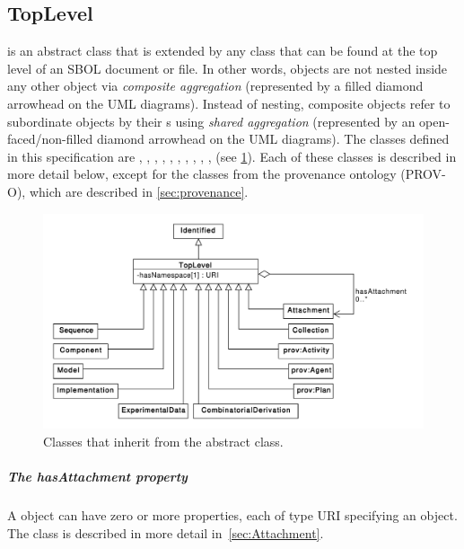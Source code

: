\subsection {TopLevel}
\label{sec:TopLevel}
 is an abstract class that is extended by any  class that can be found at the top level of an SBOL document or file.
In other words,  objects are not nested inside any other object via \textit{composite aggregation} (represented by a filled diamond arrowhead on the UML diagrams).
Instead of nesting, composite  objects refer to subordinate  objects by their s using \textit{shared aggregation} (represented by an open-faced/non-filled diamond arrowhead on the UML diagrams).
The  classes defined in this specification are , , , , , , , , , ,  (see \ref{uml:toplevel}).
Each of these classes is described in more detail below, except for the classes from the provenance ontology (PROV-O), which are described in \ref{sec:provenance}.


\begin{figure}[ht]
\begin{center}
\includegraphics[width=\textwidth]{uml/toplevel}
\caption[]{Classes that inherit from the  abstract class.}
\label{uml:toplevel}
\end{center}
\end{figure}



\subparagraph{The hasAttachment property}
\label{sec:hasAttachment}
A  object can have zero or more  properties, each of type URI specifying an  object. The  class is described in more detail in~\ref{sec:Attachment}.

